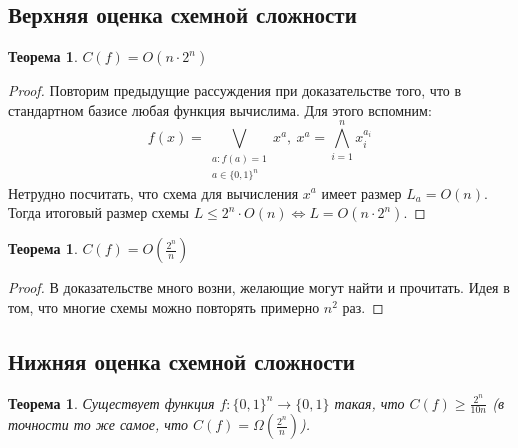 \documentclass[a4paper, 12pt]{article}
\newtheorem*{on2n}{Теорема}
\newtheorem*{o2ndivn}{Теорема}
\newtheorem*{existsFgthen2ndivn}{Теорема}
\begin{document}
\subsection*{Верхняя оценка схемной сложности}
\begin{on2n}
    $C(f) = O(n \cdot 2^n)$
\end{on2n}
\begin{proof}
    Повторим предыдущие рассуждения при доказательстве того, что в стандартном
    базисе любая функция вычислима. Для этого вспомним:
    \[
    f(x) = \bigvee\limits_{\substack{a: f(a) = 1 \\ a \in \{0, 1\}^n}} x^a, \ 
    x^a = \bigwedge\limits_{i = 1}^{n} x_i^{a_i}
    \]
    Нетрудно посчитать, что схема для вычисления $x^a$ имеет размер $L_a = O(n)$.
    Тогда итоговый размер схемы $L \leqslant 2^n \cdot O(n) \iff L = O(n \cdot 2^n)$.
\end{proof}
\begin{o2ndivn}
    $C(f) = O(\frac{2^n}{n})$
\end{o2ndivn}
\begin{proof}
    В доказательстве много возни, желающие могут найти и прочитать.
    Идея в том, что многие схемы можно повторять примерно $n^2$ раз.
\end{proof}

\subsection*{Нижняя оценка схемной сложности}
\begin{existsFgthen2ndivn}
    Существует функция $f: \{0, 1\}^n \rightarrow \{0, 1\}$
    такая, что $C(f) \geqslant \frac{2^n}{10n}$ 
    (в точности то же самое, что $C(f) = \Omega(\frac{2^n}{n})$).
\end{existsFgthen2ndivn}
\end{document}
